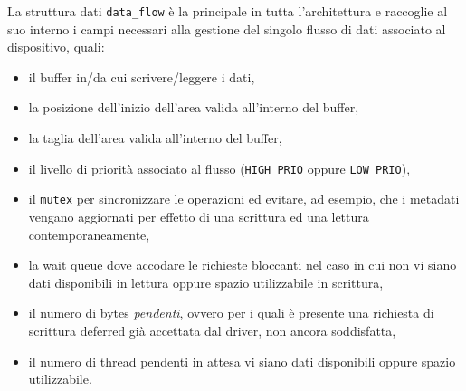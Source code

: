\documentclass{article}
\begin{document}
La struttura dati \texttt{data\_flow} è la principale in tutta l'architettura e raccoglie al suo interno i campi necessari alla gestione del singolo flusso di dati associato al dispositivo, quali:
\begin{itemize}
        \item il buffer in/da cui scrivere/leggere i dati,
        \item la posizione dell'inizio dell'area valida all'interno del buffer,
        \item la taglia dell'area valida all'interno del buffer,
        \item il livello di priorità associato al flusso (\texttt{HIGH\_PRIO} oppure \texttt{LOW\_PRIO}),
        \item il \texttt{mutex} per sincronizzare le operazioni ed evitare, ad esempio, che i metadati vengano aggiornati per effetto di una scrittura ed una lettura contemporaneamente,
        \item la wait queue dove accodare le richieste bloccanti nel caso in cui non vi siano dati disponibili in lettura oppure spazio utilizzabile in scrittura,
        \item il numero di bytes \textit{pendenti}, ovvero per i quali è presente una richiesta di scrittura deferred già accettata dal driver, non ancora soddisfatta,
        \item il numero di thread pendenti in attesa vi siano dati disponibili oppure spazio utilizzabile.
\end{itemize}
\end{document}
